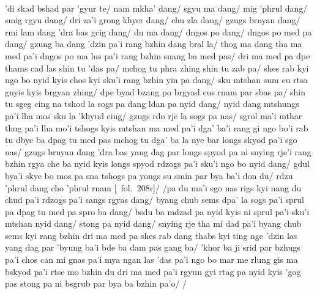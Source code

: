 \documentclass[12pt]{article}
\begin{document}
\textbf{\TVA}\\
'di skad bshad par 'gyur te/ nam mkha' dang/ sgyu ma dang/ mig 'phrul dang/ smig rgyu dang/ dri za'i grong khyer dang/ chu zla dang/ gzugs brnyan dang/ rmi lam dang 'dra bas gcig dang/ du ma dang/ dngos po dang/ dngos po med pa dang/ gzung ba dang 'dzin pa'i rang bzhin dang bral la/ thog ma dang tha ma med pa'i dngos po ma lus pa'i rang bzhin snang ba med pas/ dri ma med pa dpe thams cad las shin tu 'das pa/ mchog tu phra zhing shin tu zab pa/ shes rab kyi ngo bo nyid kyis chos kyi sku'i rang bzhin yin pa dang/ sku mtshan sum cu rtsa gnyis kyis brgyan zhing/ dpe byad bzang po brgyad cus rnam par sbas pa/ shin tu sgeg cing na tshod la sogs pa dang ldan pa nyid dang/ nyid dang mtshungs pa'i lha mos sku la 'khyud cing/ gzugs rdo rje la sogs pa nas/ sgrol ma'i mthar thug pa'i lha mo'i tshogs kyis mtshan ma med pa'i dga' ba'i rang gi ngo bo'i rab tu dbye ba dpag tu med pas mchog tu dga' ba la nye bar longs skyod pa'i sgo nas/ gzugs brnyan dang 'dra bas yang dag par longs spyod pa ni snying rje'i rang bzhin rgya che ba nyid kyis longs spyod rdzogs pa'i sku'i ngo bo nyid dang/ gdul bya'i skye bo mos pa sna tshogs pa yongs su smin par bya ba'i don du/ rdzu 'phrul dang cho 'phrul rnam [\TVA\ fol.\ 208r]/ /pa du ma'i sgo nas rigs kyi nang du chud pa'i rdzogs pa'i sangs rgyas dang/ byang chub sems dpa' la sogs pa'i sprul pa dpag tu med pa spro ba dang/ bsdu ba mdzad pa nyid kyis ni sprul pa'i sku'i mtshan nyid dang/ stong pa nyid dang/ snying rje tha mi dad pa'i byang chub sems kyi rang bzhin dri ma med pa shes rab dang thabs kyi ting nge 'dzin las yang dag par 'byung ba'i bde ba dam pas gang ba/ 'khor ba ji srid par bzhugs pa'i chos can mi gnas pa'i mya ngan las 'das pa'i ngo bo mar me rlung gis ma bskyod pa'i rtse mo bzhin du dri ma med pa'i rgyun gyi rtag pa nyid kyis 'gog pas stong pa ni bsgrub par bya ba bzhin pa'o/ /\\
\end{document}
